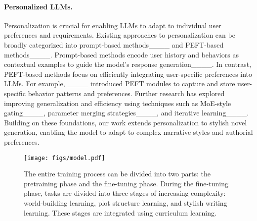 \paragraph{Personalized LLMs.}
Personalization is crucial for enabling LLMs to adapt to individual user preferences and requirements. 
Existing approaches to personalization can be broadly categorized into prompt-based methods____ and PEFT-based methods____.
Prompt-based methods encode user history and behaviors as contextual examples to guide the model’s response generation____. In contrast, PEFT-based methods focus on efficiently integrating user-specific preferences into LLMs. For example, ____ introduced PEFT modules to capture and store user-specific behavior patterns and preferences. Further research has explored improving generalization and efficiency using techniques such as MoE-style gating____, parameter merging strategies____, and iterative learning____.
Building on these foundations, our work extends personalization to stylish novel generation, enabling the model to adapt to complex narrative styles and authorial preferences.



\begin{figure*}[htb]
\centering
\texttt{[image: figs/model.pdf]}
\caption{
The entire training process can be divided into two parts: the pretraining phase and the fine-tuning phase. During the fine-tuning phase, tasks are divided into three stages of increasing complexity: world-building learning, plot structure learning, and stylish writing learning. These stages are integrated using curriculum learning.
}
\label{fig:framework}
\end{figure*}